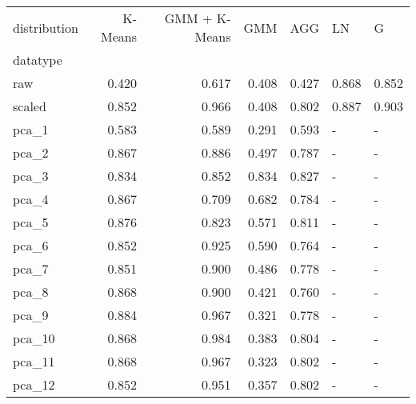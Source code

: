 \begin{tabular}{lrrrrll}
\toprule
distribution &  K-Means &  GMM + K-Means &    GMM &    AGG &     LN &      G \\
datatype &          &                &        &        &        &        \\
\midrule
raw      &    0.420 &          0.617 &  0.408 &  0.427 &  0.868 &  0.852 \\
scaled   &    0.852 &          0.966 &  0.408 &  0.802 &  0.887 &  0.903 \\
pca\_1    &    0.583 &          0.589 &  0.291 &  0.593 &      - &      - \\
pca\_2    &    0.867 &          0.886 &  0.497 &  0.787 &      - &      - \\
pca\_3    &    0.834 &          0.852 &  0.834 &  0.827 &      - &      - \\
pca\_4    &    0.867 &          0.709 &  0.682 &  0.784 &      - &      - \\
pca\_5    &    0.876 &          0.823 &  0.571 &  0.811 &      - &      - \\
pca\_6    &    0.852 &          0.925 &  0.590 &  0.764 &      - &      - \\
pca\_7    &    0.851 &          0.900 &  0.486 &  0.778 &      - &      - \\
pca\_8    &    0.868 &          0.900 &  0.421 &  0.760 &      - &      - \\
pca\_9    &    0.884 &          0.967 &  0.321 &  0.778 &      - &      - \\
pca\_10   &    0.868 &          0.984 &  0.383 &  0.804 &      - &      - \\
pca\_11   &    0.868 &          0.967 &  0.323 &  0.802 &      - &      - \\
pca\_12   &    0.852 &          0.951 &  0.357 &  0.802 &      - &      - \\
\bottomrule
\end{tabular}
